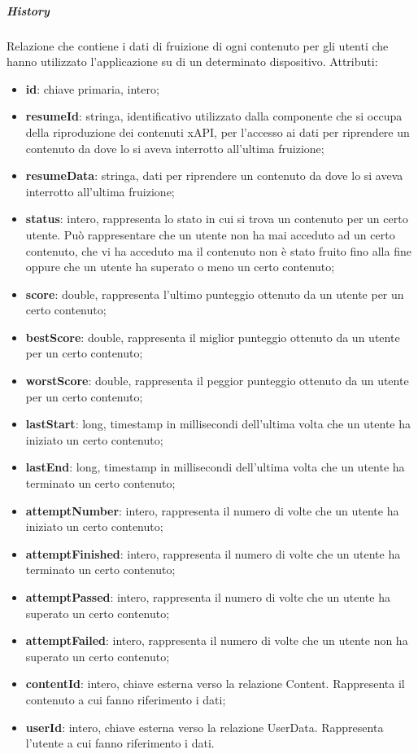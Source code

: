 \documentclass[../Tesi.tex]{subfiles}
\begin{document}
				\subparagraph*{History}
				Relazione che contiene i dati di fruizione di ogni contenuto per gli utenti che hanno utilizzato l'applicazione su di un determinato dispositivo. Attributi:
				\begin{itemize}
					\item \textbf{id}: chiave primaria, intero;
					\item \textbf{resumeId}: stringa, identificativo utilizzato dalla componente che si occupa della riproduzione dei contenuti xAPI, per l'accesso ai dati per riprendere un contenuto da dove lo si aveva interrotto all'ultima fruizione;
					\item \textbf{resumeData}: stringa, dati per riprendere un contenuto da dove lo si aveva interrotto all'ultima fruizione;
					\item \textbf{status}: intero, rappresenta lo stato in cui si trova un contenuto per un certo utente. Può rappresentare che un utente non ha mai acceduto ad un certo contenuto, che vi ha acceduto ma il contenuto non è stato fruito fino alla fine oppure che un utente ha superato o meno un certo contenuto;
					\item \textbf{score}: double, rappresenta l'ultimo punteggio ottenuto da un utente per un certo contenuto;
					\item \textbf{bestScore}: double, rappresenta il miglior punteggio ottenuto da un utente per un certo contenuto;
					\item \textbf{worstScore}: double, rappresenta il peggior punteggio ottenuto da un utente per un certo contenuto;
					\item \textbf{lastStart}: long, timestamp in millisecondi dell'ultima volta che un utente ha iniziato un certo contenuto;
					\item \textbf{lastEnd}: long, timestamp in millisecondi dell'ultima volta che un utente ha terminato un certo contenuto;
					\item \textbf{attemptNumber}: intero, rappresenta il numero di volte che un utente ha iniziato un certo contenuto;
					\item \textbf{attemptFinished}: intero, rappresenta il numero di volte che un utente ha terminato un certo contenuto;
					\item \textbf{attemptPassed}: intero, rappresenta il numero di volte che un utente ha superato un certo contenuto;
					\item \textbf{attemptFailed}: intero, rappresenta il numero di volte che un utente non ha superato un certo contenuto;
					\item \textbf{contentId}: intero, chiave esterna verso la relazione Content. Rappresenta il contenuto a cui fanno riferimento i dati;
					\item \textbf{userId}: intero, chiave esterna verso la relazione UserData. Rappresenta l'utente a cui fanno riferimento i dati.
				\end{itemize}
\end{document}
